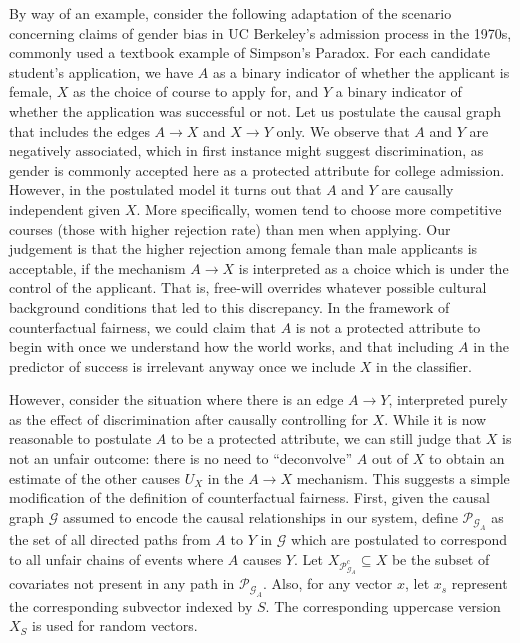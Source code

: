 By way of an example, consider the following adaptation of the
scenario concerning claims of gender bias in UC Berkeley's admission
process in the 1970s, commonly used a textbook example of Simpson's
Paradox. For each candidate student's application, we have $A$ as a
binary indicator of whether the applicant is female, $X$ as the choice
of course to apply for, and $Y$ a binary indicator of whether the
application was successful or not.  Let us postulate the causal graph
that includes the edges $A \rightarrow X$ and $X \rightarrow Y$ only.
We observe that $A$ and $Y$ are negatively associated, which in first
instance might suggest discrimination, as gender is commonly accepted
here as a protected attribute for college admission. However, in the
postulated model it turns out that $A$ and $Y$ are causally independent given
$X$. More specifically, women tend to choose more competitive courses
(those with higher rejection rate) than men when applying.  Our
judgement is that the higher rejection among female than male
applicants is acceptable, if the mechanism $A \rightarrow X$ is
interpreted as a choice which is under the control of the applicant.
That is, free-will overrides whatever possible cultural background conditions
that led to this discrepancy. In the framework of counterfactual
fairness, we could claim that $A$ is not a protected attribute to
begin with once we understand how the world works, and that including
$A$ in the predictor of success is irrelevant anyway once we include
$X$ in the classifier.

However, consider the situation where there is an edge $A \rightarrow
Y$, interpreted purely as the effect of discrimination after causally
controlling for $X$.  While it is now reasonable to postulate $A$ to
be a protected attribute, we can still judge that $X$ is not an unfair
outcome: there is no need to ``deconvolve'' $A$ out of $X$ to obtain
an estimate of the other causes $U_X$ in the $A \rightarrow X$
mechanism. This suggests a simple modification of the definition of
counterfactual fairness. First, given the causal graph $\mathcal G$ assumed to
encode the causal relationships in our system, define $\mathcal P_{\mathcal G_A}$ as
the set of all directed paths from $A$ to $Y$ in $\mathcal G$ which
are postulated to correspond to all unfair chains of events where $A$
causes $Y$. Let $X_{\mathcal P^c_{\mathcal G_A}} \subseteq X$ be the
subset of covariates not present in any path in $\mathcal P_{\mathcal
  G_A}$. Also, for any vector $x$, let $x_s$ represent the
corresponding subvector indexed by $S$. The corresponding uppercase
version $X_S$ is used for random vectors.

